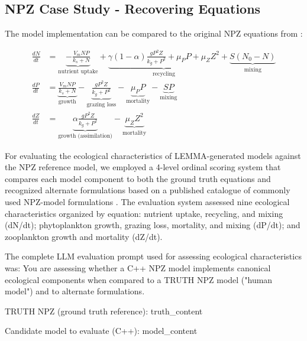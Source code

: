\setcounter{section}{0}
\renewcommand{\thesection}{S\arabic{section}}



\subsection{NPZ Case Study - Recovering Equations}
\label{subsec:npz_evaluation_prompt}

The model implementation can be compared to the original NPZ equations from \cite{edwards1999zooplankton}:

\begin{align*}
    \frac{dN}{dt} &= \underbrace{-\frac{V_m N P}{k_s + N}}_{\text{nutrient uptake}}
                   + \underbrace{\gamma(1-\alpha)\frac{g P^2 Z}{k_g + P^2} + \mu_P P + \mu_Z Z^2}_{\text{recycling}}
                   + \underbrace{S(N_0 - N)}_{\text{mixing}} \\[6pt]
    \frac{dP}{dt} &= \underbrace{\frac{V_m N P}{k_s + N}}_{\text{growth}}
                   - \underbrace{\frac{g P^2 Z}{k_g + P^2}}_{\text{grazing loss}}
                   - \underbrace{\mu_P P}_{\text{mortality}}
                   - \underbrace{S P}_{\text{mixing}} \\[6pt]
    \frac{dZ}{dt} &= \underbrace{\alpha\frac{g P^2 Z}{k_g + P^2}}_{\text{growth (assimilation)}}
                   - \underbrace{\mu_Z Z^2}_{\text{mortality}}
    \end{align*}


For evaluating the ecological characteristics of LEMMA-generated models against the NPZ reference model, we employed a 4-level ordinal scoring system that compares each model component to both the ground truth equations and recognized alternate formulations based on a published catalogue of commonly used NPZ-model formulations \citep{franks2002npz}. The evaluation system assessed nine ecological characteristics organized by equation: nutrient uptake, recycling, and mixing (dN/dt); phytoplankton growth, grazing loss, mortality, and mixing (dP/dt); and zooplankton growth and mortality (dZ/dt).


The complete LLM evaluation prompt used for assessing ecological characteristics was:
You are assessing whether a C++ NPZ model implements canonical ecological components
when compared to a TRUTH NPZ model ("human model") and to alternate formulations.

TRUTH NPZ (ground truth reference):
{truth\_content}

Candidate model to evaluate (C++):
{model\_content}

